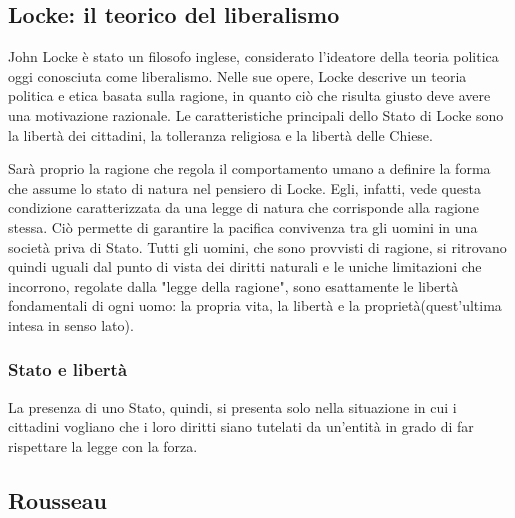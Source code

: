 \documentclass[10pt,a4paper]{article}
\begin{document}
	\subsection*{Locke: il teorico del liberalismo}
	
	John Locke è stato un filosofo inglese, considerato l'ideatore della teoria politica oggi conosciuta come liberalismo. Nelle sue opere, Locke descrive un teoria politica e etica basata sulla ragione, in quanto ciò che risulta giusto deve avere una motivazione razionale. Le caratteristiche principali dello Stato di Locke sono la libertà dei cittadini, la tolleranza religiosa e la libertà delle Chiese. 
	
	Sarà proprio la ragione che regola il comportamento umano a definire la forma che assume lo stato di natura nel pensiero di Locke. Egli, infatti, vede questa condizione caratterizzata da una legge di natura che corrisponde alla ragione stessa. Ciò permette di garantire la pacifica convivenza tra gli uomini in una società priva di Stato. Tutti gli uomini, che sono provvisti di ragione, si ritrovano quindi uguali dal punto di vista dei diritti naturali e le uniche limitazioni che incorrono, regolate dalla "legge della ragione", sono esattamente le libertà fondamentali di ogni uomo: la propria vita, la libertà e la proprietà(quest'ultima intesa in senso lato).
	
	\subsubsection*{Stato e libertà}
	
	La presenza di uno Stato, quindi, si presenta solo nella situazione in cui i cittadini vogliano che i loro diritti siano tutelati da un'entità in grado di far rispettare la legge con la forza.
	
	\subsection*{Rousseau}
	
\end{document}
